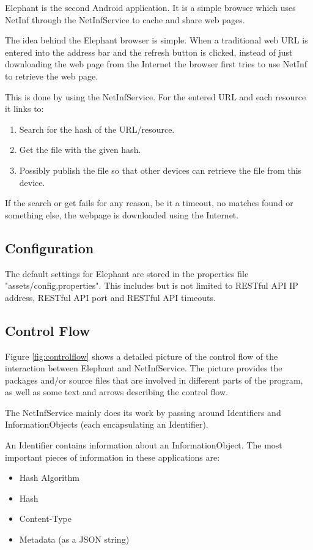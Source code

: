 Elephant is the second Android application. It is a simple browser which uses NetInf through the NetInfService to cache and share web pages.

The idea behind the Elephant browser is simple. When a traditional web URL is entered into the address bar and the refresh button is clicked, instead of just downloading the web page from the Internet the browser first tries to use NetInf to retrieve the web page.

This is done by using the NetInfService. For the entered URL and each resource it links to:
\begin{enumerate}
	\item Search for the hash of the URL/resource.
	\item Get the file with the given hash.
	\item Possibly publish the file so that other devices can retrieve the file from this device.
\end{enumerate}

If the search or get fails for any reason, be it a timeout, no matches found or something else, the webpage is downloaded using the Internet.

\subsection{Configuration}

The default settings for Elephant are stored in the properties file "assets/config.properties". This includes but is not limited to RESTful API IP address, RESTful API port and RESTful API timeouts.

\subsection{Control Flow}
\label{sec:Control Flow}

Figure \ref{fig:controlflow} shows a detailed picture of the control flow of the interaction between Elephant and NetInfService. The picture provides the packages and/or source files that are involved in different parts of the program, as well as some text and arrows describing the control flow.

The NetInfService mainly does its work by passing around Identifiers and InformationObjects (each encapsulating an Identifier).

An Identifier contains information about an InformationObject. The most important pieces of information in these applications are:
\begin{itemize}
\item Hash Algorithm
\item Hash
\item Content-Type
\item Metadata (as a JSON string)
\end{itemize}

